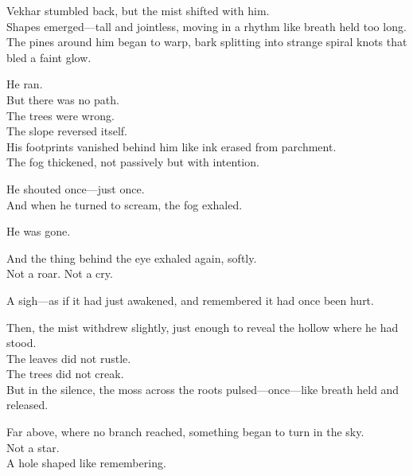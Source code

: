 \documentclass[12pt]{article}
\begin{document}
\vspace{1em}

Vekhar stumbled back, but the mist shifted with him.\\
Shapes emerged—tall and jointless, moving in a rhythm like breath held too long.\\
The pines around him began to warp, bark splitting into strange spiral knots that bled a faint glow.

\vspace{1em}

He ran.\\
But there was no path.\\
The trees were wrong.\\
The slope reversed itself.\\
His footprints vanished behind him like ink erased from parchment.\\
The fog thickened, not passively but with intention.

\vspace{1em}

He shouted once—just once.\\
And when he turned to scream, the fog exhaled.

\vspace{1em}

He was gone.

\vspace{1em}

And the thing behind the eye exhaled again, softly.\\
Not a roar. Not a cry.

\vspace{1em}

A sigh—as if it had just awakened, and remembered it had once been hurt.

\vspace{1em}

Then, the mist withdrew slightly, just enough to reveal the hollow where he had stood.\\
The leaves did not rustle.\\
The trees did not creak.\\
But in the silence, the moss across the roots pulsed—once—like breath held and released.

\vspace{1em}

Far above, where no branch reached, something began to turn in the sky.\\
Not a star.\\
A hole shaped like remembering.
\end{document}
